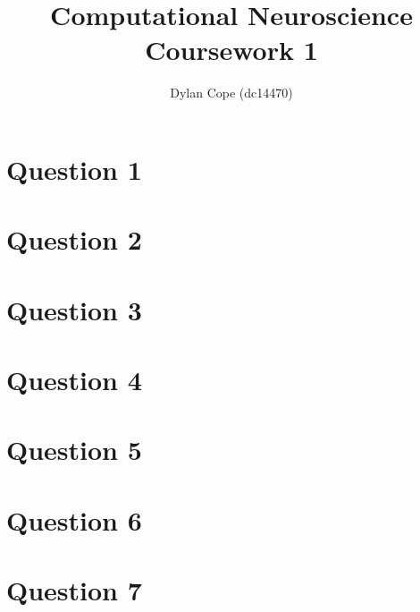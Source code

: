 \documentclass[12pt, a4paper]{article}
\title{Computational Neuroscience Coursework 1}
\author{Dylan Cope (dc14470)}
\date{}
\begin{document}
\nocite{*}


\maketitle

\section*{Question 1}

\section*{Question 2}

\section*{Question 3}

\section*{Question 4}

\section*{Question 5}

\section*{Question 6}

\section*{Question 7}




\bibdata
\end{document}
